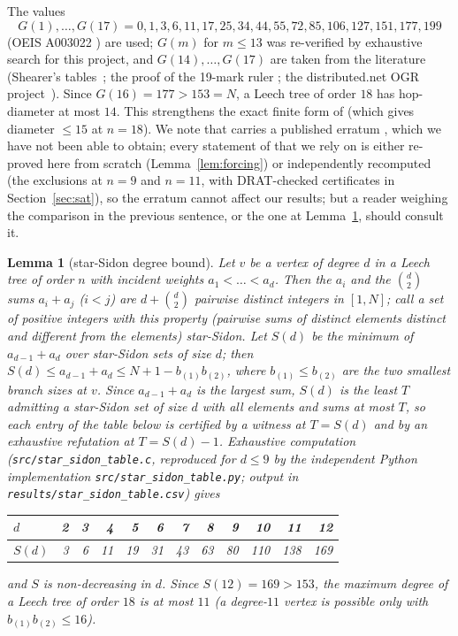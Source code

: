 \documentclass[11pt,a4paper]{article}
\theoremstyle{plain}
\newtheorem{lemma}[theorem]{Lemma}
\theoremstyle{remark}
\newcommand{\bin}[2]{\binom{#1}{#2}}
\newcommand{\file}[1]{\texttt{#1}}
\newcommand{\bk}{\discretionary{}{}{}}
\begin{document}
The values
\[
G(1),\dots,G(17)=0,1,3,6,11,17,25,34,44,55,72,85,106,127,151,177,199
\]
(OEIS A003022 \cite{OEIS}) are used; $G(m)$ for $m\le 13$ was re-verified by
exhaustive search for this project, and $G(14),\dots,G(17)$ are taken from the
literature (Shearer's tables~\cite{Shearer1990}; the proof of the 19-mark ruler
\cite{Dollas1998}; the distributed.net OGR project~\cite{DistributedNetOGR}).
Since $G(16)=177>153=N$, a Leech tree of order $18$ has hop-diameter at most
$14$.  This strengthens the exact finite form of
\cite[Thm.~2]{SzekelyWangZhang2005} (which gives diameter $\le 15$ at $n=18$).
We note that \cite{SzekelyWangZhang2005} carries a published erratum
\cite{SzekelyWangZhangErratum2008}, which we have not been able to obtain; every
statement of \cite{SzekelyWangZhang2005} that we rely on is either re-proved
here from scratch (Lemma~\ref{lem:forcing}) or independently recomputed
(the exclusions at $n=9$ and $n=11$, with DRAT-checked certificates in
Section~\ref{sec:sat}), so the erratum cannot affect our results; but a reader
weighing the comparison in the previous sentence, or the one at
Lemma~\ref{lem:sidon}, should consult it.

\begin{lemma}[star-Sidon degree bound]\label{lem:sidon}
Let $v$ be a vertex of degree $d$ in a Leech tree of order $n$ with incident
weights $a_1<\dots<a_d$.  Then the $a_i$ and the $\bin d2$ sums $a_i+a_j$
($i<j$) are $d+\bin d2$ pairwise distinct integers in $[1,N]$; call a set of
positive integers with this property (pairwise sums of \emph{distinct} elements
distinct and different from the elements) \emph{star-Sidon}.  Let $S(d)$ be the
minimum of $a_{d-1}+a_d$ over star-Sidon sets of size $d$; then
$S(d)\le a_{d-1}+a_d\le N+1-b_{(1)}b_{(2)}$, where $b_{(1)}\le b_{(2)}$ are the
two smallest branch sizes at $v$.  Since $a_{d-1}+a_d$ is the largest sum,
$S(d)$ is the least $T$ admitting a star-Sidon set of size $d$ with all elements
and sums at most $T$, so each entry of the table below is certified by a witness
at $T=S(d)$ and by an exhaustive refutation at $T=S(d)-1$.  Exhaustive
computation (\file{src/star\_\bk sidon\_\bk table.c}, reproduced for $d\le9$ by
the independent Python implementation \file{src/star\_\bk sidon\_\bk table.py};
output in \file{results/star\_\bk sidon\_\bk table.csv}) gives
\begin{center}
\begin{tabular}{@{}l*{11}{r}@{}}
\toprule
$d$    & 2 & 3 & 4  & 5  & 6  & 7  & 8  & 9  & 10  & 11  & 12\\
\midrule
$S(d)$ & 3 & 6 & 11 & 19 & 31 & 43 & 63 & 80 & 110 & 138 & 169\\
\bottomrule
\end{tabular}
\end{center}
and $S$ is non-decreasing in $d$.  Since $S(12)=169>153$, the maximum degree of
a Leech tree of order $18$ is at most $11$ (a degree-$11$ vertex is possible only
with $b_{(1)}b_{(2)}\le 16$).
\end{lemma}
\end{document}
